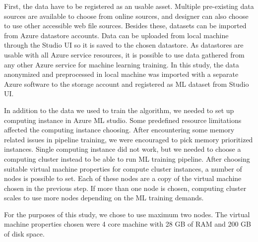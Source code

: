 First,
the data have to be registered as an usable asset.
Multiple pre-existing data sources are available to choose
from online sources,
and designer can also choose to use
other accessible web file sources.
Besides these,
datasets can be imported from Azure datastore accounts.
Data can be uploaded from local machine through the Studio UI
so it is saved to the chosen datastore.
As datastores are usable with all Azure service resources,
it is possible to use data gathered from any other Azure service
for machine learning training.
In this study,
the data anonymized and preprocessed in local machine
was imported with a separate Azure software to the storage account
and registered as ML dataset from Studio UI.

In addition to the data we used to train the algorithm,
we needed to set up computing instance
in Azure ML studio.
Some predefined resource limitations
affected the computing instance choosing.
After encountering some memory related issues in pipeline training,
we were encouraged to pick memory prioritized instances.
Single computing instance did not work,
but we needed to choose a computing cluster instead
to be able to run ML training pipeline.
After choosing suitable virtual machine properties for compute cluster instances,
a number of nodes is possible to set.
Each of these nodes are a copy of the virtual machine
chosen in the previous step.
If more than one node is chosen,
computing cluster scales to use more nodes
depending on the ML training demands.

For the purposes of this study,
we chose to use maximum two nodes.
The virtual machine properties chosen
were 4 core machine with 28 GB of RAM and 200 GB of disk space.


\clearpage